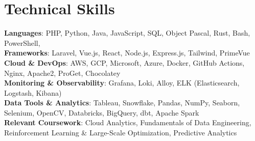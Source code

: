 \documentclass[letterpaper,11pt]{article}
\begin{document}

\vspace{-10pt}
\section{Technical Skills}
 \begin{itemize}[leftmargin=0.15in, label={}]
    \small{\item{
     \textbf{Languages}{: PHP, Python, Java, JavaScript, SQL, Object Pascal, Rust, Bash, PowerShell, } \\
     \textbf{Frameworks}{: Laravel, Vue.js, React, Node.js, Express.js, Tailwind, PrimeVue} \\
     \textbf{Cloud \& DevOps}{: AWS, GCP, Microsoft, Azure, Docker, GitHub Actions, Nginx, Apache2, ProGet, Chocolatey} \\
     \textbf{Monitoring \& Observability}{: Grafana, Loki, Alloy, ELK (Elasticsearch, Logstash, Kibana)} \\
     \textbf{Data Tools \& Analytics}{: Tableau, Snowflake, Pandas, NumPy, Seaborn, Selenium, OpenCV, Databricks, BigQuery, dbt, Apache Spark}
    \\
     \textbf{Relevant Coursework}{: Cloud Analytics, Fundamentals of Data Engineering, Reinforcement Learning \& Large-Scale Optimization, Predictive Analytics}


    }}
 \end{itemize}
\end{document}

